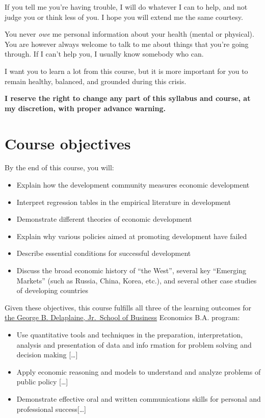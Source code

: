 \documentclass{article}
\providecommand{\tightlist}{%
  \setlength{\itemsep}{0pt}\setlength{\parskip}{0pt}}
\begin{document}
If you tell me you're having trouble, I will do whatever I can to help,
and not judge you or think less of you. I hope you will extend me the
same courtesy.

You never \emph{owe} me personal information about your health (mental
or physical). You are however always welcome to talk to me about things
that you're going through. If I can't help you, I usually know somebody
who can.

I want you to learn a lot from this course, but it is more important for
you to remain healthy, balanced, and grounded during this crisis.

\textbf{I reserve the right to change any part of this syllabus and
course, at my discretion, with proper advance warning.}

\hypertarget{course-objectives}{%
\section{Course objectives}\label{course-objectives}}

{By the end of this course,} you will:

\begin{itemize}
\tightlist
\item
  Explain how the development community measures economic development
\item
  Interpret regression tables in the empirical literature in development
\item
  Demonstrate different theories of economic development
\item
  Explain why various policies aimed at promoting development have
  failed
\item
  Describe essential conditions for successful development
\item
  Discuss the broad economic history of ``the West'', several key
  ``Emerging Markets'' (such as Russia, China, Korea, etc.), and several
  other case studies of developing countries
\end{itemize}

Given these objectives, this course fulfills all three of the learning
outcomes for
\href{https://www.hood.edu/academics/departments/george-b-delaplaine-jr-school-business/student-learning-outcomes}{the
George B. Delaplaine, Jr.~School of Business} Economics B.A. program:

\begin{itemize}
\tightlist
\item
  Use quantitative tools and techniques in the preparation,
  interpretation, analysis and presentation of data and info rmation for
  problem solving and decision making {[}\ldots{]}
\item
  Apply economic reasoning and models to understand and analyze problems
  of public policy {[}\ldots{]}
\item
  Demonstrate effective oral and written communications skills for
  personal and professional success{[}\ldots{]}
\end{itemize}
\end{document}
